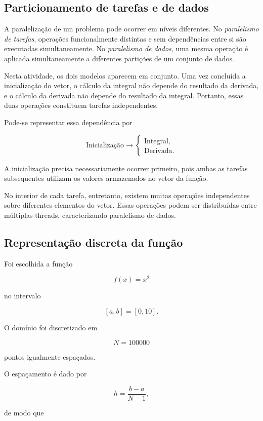 \subsection{Particionamento de tarefas e de dados}

A paralelização de um problema pode ocorrer em níveis diferentes. No
\textit{paralelismo de tarefas}, operações funcionalmente distintas e sem
dependências entre si são executadas simultaneamente. No \textit{paralelismo
de dados}, uma mesma operação é aplicada simultaneamente a diferentes
partições de um conjunto de dados.

Nesta atividade, os dois modelos aparecem em conjunto. Uma vez concluída a
inicialização do vetor, o cálculo da integral não depende do resultado da
derivada, e o cálculo da derivada não depende do resultado da integral.
Portanto, essas duas operações constituem tarefas independentes.

Pode-se representar essa dependência por

\[
\text{Inicialização}
\longrightarrow
\begin{cases}
    \text{Integral},\\
    \text{Derivada}.
\end{cases}
\]

A inicialização precisa necessariamente ocorrer primeiro, pois ambas as
tarefas subsequentes utilizam os valores armazenados no vetor da função.

No interior de cada tarefa, entretanto, existem muitas operações independentes
sobre diferentes elementos do vetor. Essas operações podem ser distribuídas
entre múltiplas threads, caracterizando paralelismo de dados.


\subsection{Representação discreta da função}

Foi escolhida a função

\[
f(x)=x^2
\]

no intervalo

\[
[a,b]=[0,10].
\]

O domínio foi discretizado em

\[
N=100000
\]

pontos igualmente espaçados.

O espaçamento é dado por

\[
h=\frac{b-a}{N-1},
\]

de modo que

